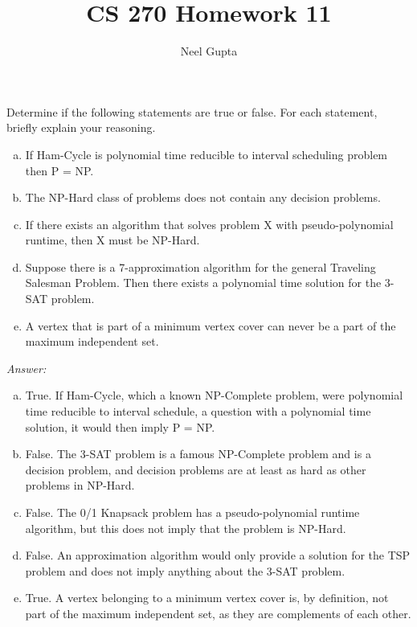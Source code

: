 \documentclass[12pt]{article}
\newenvironment{problem}[2][Problem]{\begin{trivlist}
\item[\hskip \labelsep {\bfseries #1}\hskip \labelsep {\bfseries #2.}]}{\end{trivlist}}
\begin{document}

\title{\vspace{-4cm}CS 270 Homework 11}
\author{Neel Gupta} 
\maketitle

\begin{problem}{1}
    Determine if the following statements are true or false. For each statement, briefly explain your reasoning.
    \begin{enumerate}[(a)]
        \item If Ham-Cycle is polynomial time reducible to interval scheduling problem then P = NP.
        \item The NP-Hard class of problems does not contain any decision problems.
        \item If there exists an algorithm that solves problem X with pseudo-polynomial runtime, then X must be NP-Hard.
        \item Suppose there is a 7-approximation algorithm for the general Traveling Salesman Problem. Then there exists a polynomial time solution for the 3-SAT problem.
        \item A vertex that is part of a minimum vertex cover can never be a part of the maximum independent set.
    \end{enumerate}
\end{problem}

\textit{Answer:}

\begin{enumerate}[(a)]
    \item True. If Ham-Cycle, which a known NP-Complete problem, were polynomial time reducible to interval schedule, a question with a polynomial time solution, it would then imply P = NP.
    \item False. The 3-SAT problem is a famous NP-Complete problem and is a decision problem, and decision problems are at least as hard as other problems in NP-Hard.
    \item False. The 0/1 Knapsack problem has a pseudo-polynomial runtime algorithm, but this does not imply that the problem is NP-Hard.
    \item False. An approximation algorithm would only provide a solution for the TSP problem and does not imply anything about the 3-SAT problem.
    \item True. A vertex belonging to a minimum vertex cover is, by definition, not part of the maximum independent set, as they are complements of each other.
\end{enumerate}
\end{document}

